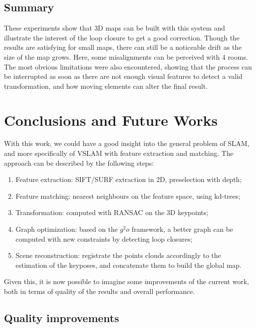 \section{Summary}
These experiments show that 3D maps can be built with this system and illustrate the interest of the loop closure to get a good correction. Though the results are satisfying for small maps, there can still be a noticeable drift as the size of the map grows. Here, some misalignments can be perceived with 4 rooms. The most obvious limitations were also encountered, showing that the process can be interrupted as soon as there are not enough visual features to detect a valid transformation, and how moving elements can alter the final result.

\chapter{Conclusions and Future Works}
\label{chap:conclusion}

With this work, we could have a good insight into the general problem of \gls{SLAM}, and more specifically of \gls{VSLAM} with feature extraction and matching. The approach can be described by the following steps:
\begin{enumerate}
\item Feature extraction: \gls{SIFT}/\gls{SURF} extraction in 2D, preselection with depth;
\item Feature matching: nearest neighbours on the feature space, using kd-trees;
\item Transformation: computed with \gls{RANSAC} on the 3D keypoints;
\item Graph optimization: based on the $g^2o$ framework, a better graph can be computed with new constraints by detecting loop closures;
\item Scene reconstruction: registrate the points clouds accordingly to the estimation of the keyposes, and concatenate them to build the global map.
\end{enumerate}

Given this, it is now possible to imagine some improvements of the current work, both in terms of quality of the results and overall performance.

\section{Quality improvements}


